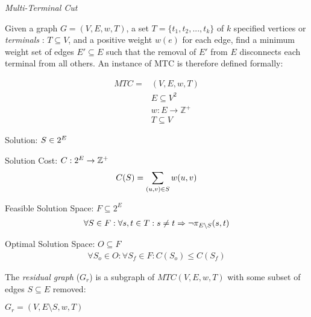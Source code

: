 \begin{definition}
{\em Multi-Terminal Cut}

Given a graph $G=(V,E,w,T)$, a set $T=\{t_1, t_2, ..., t_k\}$ of $k$ specified vertices or {\em terminals} : $T \subseteq V$, and a positive weight $w(e)$ for each edge, find a minimum weight set of edges $E' \subseteq E$ such that the removal of $E'$ from $E$ disconnects each terminal from all others.
An instance of MTC is therefore defined formally:

\begin{align}
	\nonumber MTC = & (V,E,w,T)\\
	\nonumber & E \subseteq V^2\\
	\nonumber & w : E \rightarrow \mathbb{Z}^+\\
	\nonumber & T \subseteq V
\end{align}

Solution: $S \in 2^E$

Solution Cost: $C : 2^E \rightarrow \mathbb{Z}^+$
\begin{align}
	\nonumber C(S) = \displaystyle\sum\limits_{(u,v) \in S} w(u,v)
\end{align}

Feasible Solution Space: $F \subseteq 2^E$
\begin{align}
	\nonumber \forall S \in F : \forall s, t \in T: s \neq t \Rightarrow \neg\pi_{E \setminus S}(s, t)
\end{align}

Optimal Solution Space: $O \subseteq F$
\begin{align}
	\forall S_o \in O : \forall S_f \in F : \nonumber C(S_o) \leq C(S_f)
\end{align}

\end{definition}

\begin{definition}
The {\em residual graph} ($G_r$) is a subgraph of $MTC(V,E,w,T)$ with some subset of edges $S \subseteq E$ removed:

$G_r = (V, E \setminus S, w, T)$
\end{definition}

